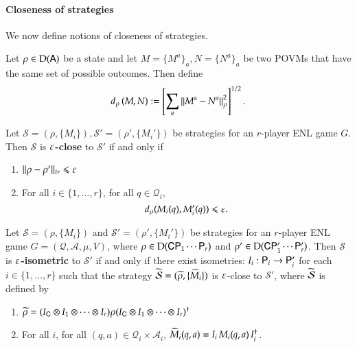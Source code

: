 \paragraph{Closeness of strategies} We now define notions of closeness of strategies. 

\begin{definition}
	Let $\rho \in \mathrm{D}({\mathsf{A}})$ be a state and let $M = \{M^a\}_a,N = \{N^a\}_a$ be two POVMs that have the same set of possible outcomes. Then define 
	\begin{align}
		d_\rho \left( M, N \right) := \left[ \sum_a \left\lVert M^a - N^a \right\rVert_\rho^2 \right]^{1/2}.
	\end{align}
\end{definition}


\begin{definition}
	Let $\mathcal{S} = (\rho,\{M_i\}), \mathcal{S}' = (\rho',\{M_i'\})$ be strategies for an $r$-player ENL game $G$. Then $\mathcal{S}$ is \textbf{$\varepsilon$-close} to $\mathcal{S}'$ if and only if
	\begin{enumerate}
		\item $ \lVert \rho - \rho'\rVert_{tr} \leqslant \varepsilon$
		\item For all $i\in\{1,\ldots,r\}$, for all $q \in \mathcal{Q}_i$,
		\[
		d_\rho(M_i(q),M_i'(q)) \leqslant \varepsilon.
		\]
	\end{enumerate}
\end{definition}

\begin{definition}
	Let $\mathcal{S} = (\rho,\{M_i\})$ and $\mathcal{S}' = (\rho',\{M_i'\})$ be strategies for an $r$-player ENL game $G = (\mathcal{Q},\mathcal{A},\mu,V)$, where $\rho \in \mathrm{D}({\mathsf{C}} {\mathsf{P}}_1 \cdots {\mathsf{P}}_r)$ and $\rho' \in \mathrm{D}({\mathsf{C}} {\mathsf{P}}_1' \cdots {\mathsf{P}}_r')$. Then $\mathcal{S}$ is \textbf{$\varepsilon$-isometric} to $\mathcal{S}'$ if and only if there exist isometries: $I_i : {\mathsf{P}}_i \to {\mathsf{P}}_i'$ for each $i\in\{1,\ldots,r\}$ such that the strategy $\widetilde{\mathcal{S}} = (\widetilde{\rho}, \{ \widetilde{M}_i \})$ is $\varepsilon$-close to $\mathcal{S}'$, where $\widetilde{\mathcal{S}}$ is defined by
	\begin{enumerate}
		\item $\widetilde{\rho} = (I_{\mathsf{C}} \otimes I_1 \otimes \cdots \otimes I_r) \rho (I_{\mathsf{C}} \otimes I_1 \otimes \cdots \otimes I_r)^\dagger$
		\item For all $i$, for all $(q,a) \in \mathcal{Q}_i \times \mathcal{A}_i$, $\widetilde{M}_i(q,a) = I_i \, M_i(q,a)\, I_i^\dagger$.
	\end{enumerate}
\end{definition}


